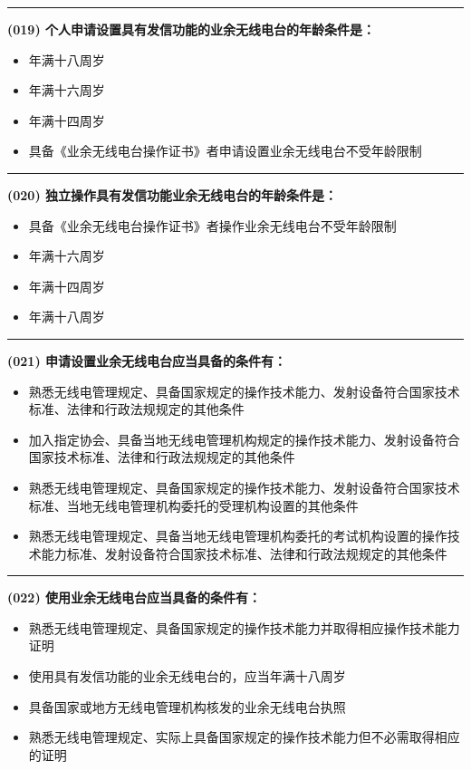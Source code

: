 \documentclass[twocolumn]{ctexart}  %
\begin{document}
\noindent\rule{0.5\textwidth}{1pt}
\heiti \textbf{(019) 个人申请设置具有发信功能的业余无线电台的年龄条件是：} \songti {\color{gray} [LK0026] }
\begin{itemize}
	\item  年满十八周岁
	\item  年满十六周岁
	\item  年满十四周岁
	\item  具备《业余无线电台操作证书》者申请设置业余无线电台不受年龄限制
\end{itemize}


\noindent\rule{0.5\textwidth}{1pt}
\heiti \textbf{(020) 独立操作具有发信功能业余无线电台的年龄条件是：} \songti {\color{gray} [LK0027] }
\begin{itemize}
	\item  具备《业余无线电台操作证书》者操作业余无线电台不受年龄限制
	\item  年满十六周岁
	\item  年满十四周岁
	\item  年满十八周岁
\end{itemize}


\noindent\rule{0.5\textwidth}{1pt}
\heiti \textbf{(021) 申请设置业余无线电台应当具备的条件有：} \songti {\color{gray} [LK0041] }
\begin{itemize}
	\item  熟悉无线电管理规定、具备国家规定的操作技术能力、发射设备符合国家技术标准、法律和行政法规规定的其他条件
	\item  加入指定协会、具备当地无线电管理机构规定的操作技术能力、发射设备符合国家技术标准、法律和行政法规规定的其他条件
	\item  熟悉无线电管理规定、具备国家规定的操作技术能力、发射设备符合国家技术标准、当地无线电管理机构委托的受理机构设置的其他条件
	\item  熟悉无线电管理规定、具备当地无线电管理机构委托的考试机构设置的操作技术能力标准、发射设备符合国家技术标准、法律和行政法规规定的其他条件
\end{itemize}


\noindent\rule{0.5\textwidth}{1pt}
\heiti \textbf{(022) 使用业余无线电台应当具备的条件有：} \songti {\color{gray} [LK0042] }
\begin{itemize}
	\item  熟悉无线电管理规定、具备国家规定的操作技术能力并取得相应操作技术能力证明
	\item  使用具有发信功能的业余无线电台的，应当年满十八周岁
	\item  具备国家或地方无线电管理机构核发的业余无线电台执照
	\item  熟悉无线电管理规定、实际上具备国家规定的操作技术能力但不必需取得相应的证明
\end{itemize}
\end{document}

